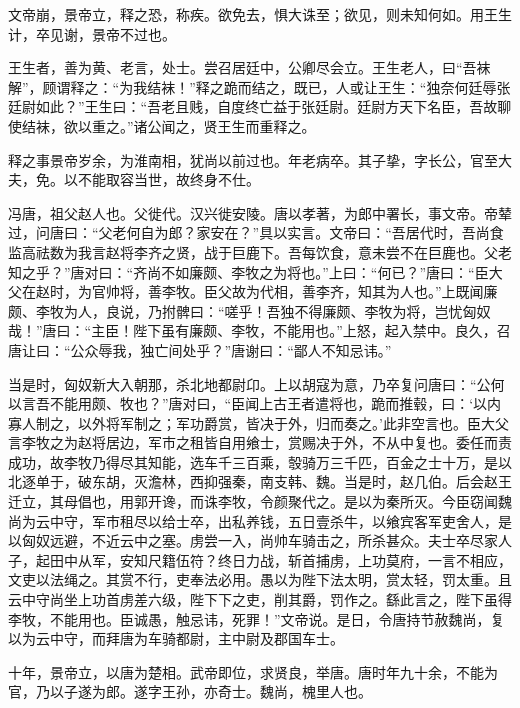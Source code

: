 \documentclass[12pt,UTF8]{ctexbook}
\begin{document}
文帝崩，景帝立，释之恐，称疾。欲免去，惧大诛至；欲见，则未知何如。用王生计，卒见谢，景帝不过也。



王生者，善为黄、老言，处士。尝召居廷中，公卿尽会立。王生老人，曰“吾袜解”，顾谓释之：“为我结袜！”释之跪而结之，既已，人或让王生：“独奈何廷辱张廷尉如此？”王生曰：“吾老且贱，自度终亡益于张廷尉。廷尉方天下名臣，吾故聊使结袜，欲以重之。”诸公闻之，贤王生而重释之。



释之事景帝岁余，为淮南相，犹尚以前过也。年老病卒。其子挚，字长公，官至大夫，免。以不能取容当世，故终身不仕。



冯唐，祖父赵人也。父徙代。汉兴徙安陵。唐以孝著，为郎中署长，事文帝。帝辇过，问唐曰：“父老何自为郎？家安在？”具以实言。文帝曰：“吾居代时，吾尚食监高祛数为我言赵将李齐之贤，战于巨鹿下。吾每饮食，意未尝不在巨鹿也。父老知之乎？”唐对曰：“齐尚不如廉颇、李牧之为将也。”上曰：“何已？”唐曰：“臣大父在赵时，为官帅将，善李牧。臣父故为代相，善李齐，知其为人也。”上既闻廉颇、李牧为人，良说，乃拊髀曰：“嗟乎！吾独不得廉颇、李牧为将，岂忧匈奴哉！”唐曰：“主臣！陛下虽有廉颇、李牧，不能用也。”上怒，起入禁中。良久，召唐让曰：“公众辱我，独亡间处乎？”唐谢曰：“鄙人不知忌讳。”



当是时，匈奴新大入朝那，杀北地都尉卬。上以胡寇为意，乃卒复问唐曰：“公何以言吾不能用颇、牧也？”唐对曰，“臣闻上古王者遣将也，跪而推毂，曰：‘以内寡人制之，以外将军制之；军功爵赏，皆决于外，归而奏之。’此非空言也。臣大父言李牧之为赵将居边，军市之租皆自用飨士，赏赐决于外，不从中复也。委任而责成功，故李牧乃得尽其知能，选车千三百乘，彀骑万三千匹，百金之士十万，是以北逐单于，破东胡，灭澹林，西抑强秦，南支韩、魏。当是时，赵几伯。后会赵王迁立，其母倡也，用郭开谗，而诛李牧，令颜聚代之。是以为秦所灭。今臣窃闻魏尚为云中守，军市租尽以给士卒，出私养钱，五日壹杀牛，以飨宾客军吏舍人，是以匈奴远避，不近云中之塞。虏尝一入，尚帅车骑击之，所杀甚众。夫士卒尽家人子，起田中从军，安知尺籍伍符？终日力战，斩首捕虏，上功莫府，一言不相应，文吏以法绳之。其赏不行，吏奉法必用。愚以为陛下法太明，赏太轻，罚太重。且云中守尚坐上功首虏差六级，陛下下之吏，削其爵，罚作之。繇此言之，陛下虽得李牧，不能用也。臣诚愚，触忌讳，死罪！”文帝说。是日，令唐持节赦魏尚，复以为云中守，而拜唐为车骑都尉，主中尉及郡国车士。



十年，景帝立，以唐为楚相。武帝即位，求贤良，举唐。唐时年九十余，不能为官，乃以子遂为郎。遂字王孙，亦奇士。魏尚，槐里人也。
\end{document}
